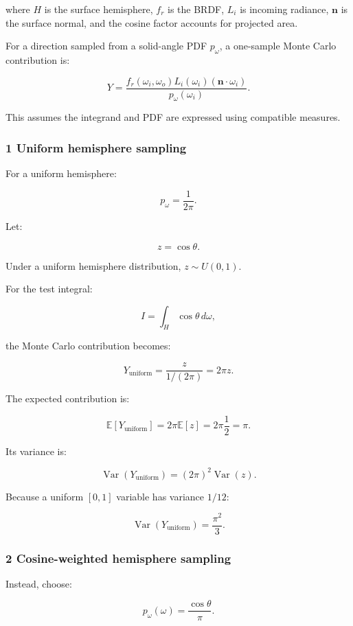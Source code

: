 where \(H\) is the surface hemisphere, \(f_r\) is the BRDF, \(L_i\) is incoming radiance, \(\mathbf n\) is the surface normal, and the cosine factor accounts for projected area.

For a direction sampled from a solid-angle PDF \(p_\omega\), a one-sample Monte Carlo contribution is:

\[
 \boxed{ Y= \frac{ f_r(\omega_i,\omega_o) L_i(\omega_i) (\mathbf n\cdot\omega_i) }{ p_\omega(\omega_i) } }.
\]

This assumes the integrand and PDF are expressed using compatible measures.

\subsubsection{1 Uniform hemisphere sampling}\label{02-foundations-ii-ch031-uniform-hemisphere-sampling}

For a uniform hemisphere:

\[
 p_\omega=\frac1{2\pi}.
\]

Let:

\[
 z=\cos\theta.
\]

Under a uniform hemisphere distribution, \(z\sim U(0,1)\).

For the test integral:

\[
 I=\int_H\cos\theta\,d\omega,
\]

the Monte Carlo contribution becomes:

\[
 Y_{\mathrm{uniform}} = \frac z{1/(2\pi)} =2\pi z.
\]

The expected contribution is:

\[
 \mathbb E[Y_{\mathrm{uniform}}] = 2\pi\mathbb E[z] =2\pi\frac12 =\pi.
\]

Its variance is:

\[
 \operatorname{Var}(Y_{\mathrm{uniform}}) = (2\pi)^2\operatorname{Var}(z).
\]

Because a uniform \([0,1]\) variable has variance \(1/12\):

\[
 \boxed{ \operatorname{Var}(Y_{\mathrm{uniform}}) = \frac{\pi^2}{3} }.
\]

\subsubsection{2 Cosine-weighted hemisphere sampling}\label{02-foundations-ii-ch031-cosine-weighted-hemisphere-sampling}

Instead, choose:

\[
 \boxed{ p_\omega(\omega)=\frac{\cos\theta}{\pi} }.
\]

